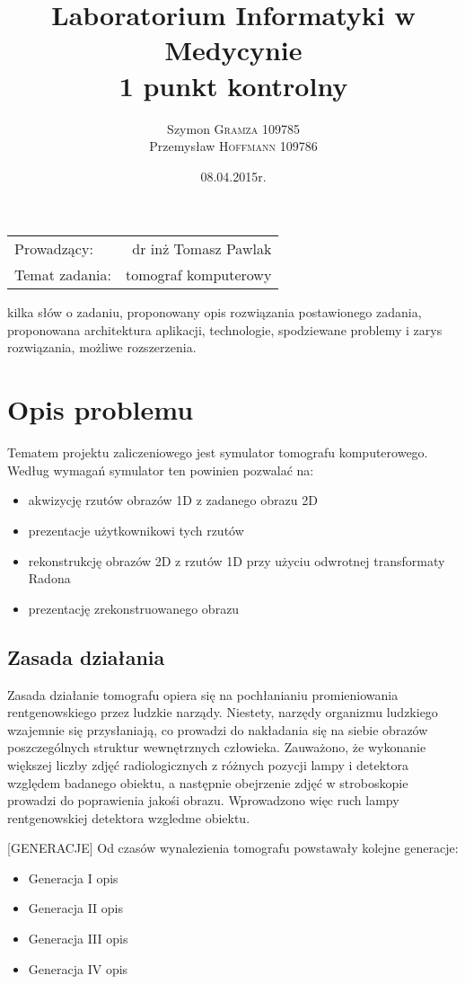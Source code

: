 \documentclass[A_4paper,12pt]{article}
\title{Laboratorium Informatyki w Medycynie \\ 1 punkt kontrolny} %
\author{Szymon \textsc{Gramza} 109785  \\ Przemysław \textsc{Hoffmann} 109786} %
\date{08.04.2015r.} %
\begin{document}
\maketitle %

\begin{center}
\begin{tabular}{l r}
Prowadzący: & dr inż Tomasz Pawlak \\
Temat zadania: & tomograf komputerowy
\end{tabular}
\end{center}

\newpage
 kilka słów o zadaniu, proponowany opis rozwiązania postawionego zadania, 
 proponowana architektura aplikacji, technologie, 
 spodziewane problemy i zarys rozwiązania, możliwe rozszerzenia.
 
\section{Opis problemu}
Tematem projektu zaliczeniowego jest symulator tomografu komputerowego.
Według wymagań symulator ten powinien pozwalać na:
\begin{itemize}
\item akwizycję rzutów obrazów 1D z zadanego obrazu 2D
\item prezentacje użytkownikowi tych rzutów
\item rekonstrukcję obrazów 2D z rzutów 1D przy użyciu odwrotnej transformaty Radona
\item prezentację zrekonstruowanego obrazu
\end{itemize}

\subsection{Zasada działania}
Zasada działanie tomografu opiera się na pochłanianiu promieniowania rentgenowskiego przez ludzkie narządy.
Niestety, narzędy organizmu ludzkiego wzajemnie się przysłaniają, co prowadzi do nakładania się na siebie obrazów poszczególnych struktur wewnętrznych człowieka.
Zauważono, że wykonanie większej liczby zdjęć radiologicznych z różnych pozycji lampy i detektora względem badanego obiektu, a następnie obejrzenie zdjęć w stroboskopie prowadzi do poprawienia jakośi obrazu. Wprowadzono więc ruch lampy rentgenowskiej detektora wzgledme obiektu.

[GENERACJE]
Od czasów wynalezienia tomografu powstawały kolejne generacje:
\begin{itemize}
\item {Generacja I} opis
\item {Generacja II} opis
\item {Generacja III} opis
\item {Generacja IV} opis
\end{itemize}
\end{document}
